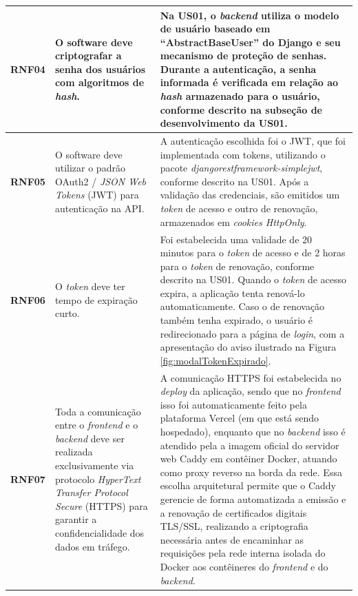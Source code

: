 \begin{longtable}{p{1.35cm}p{4.75cm}p{8.1cm}}
\textbf{RNF04} & O software deve criptografar a senha dos usuários com algoritmos de \textit{hash}. &
Na US01, o \textit{backend} utiliza o modelo de usuário baseado em ``AbstractBaseUser'' do Django e seu mecanismo de proteção de senhas. Durante a autenticação, a senha informada é verificada em relação ao \textit{hash} armazenado para o usuário, conforme descrito na subseção de desenvolvimento da US01. \\
\midrule

\textbf{RNF05} & O software deve utilizar o padrão OAuth2 / \textit{JSON Web Tokens} (JWT) para autenticação na API. &
A autenticação escolhida foi o JWT, que foi implementada com tokens, utilizando o pacote \textit{djangorestframework-simplejwt}, conforme descrito na US01. Após a validação das credenciais, são emitidos um \textit{token} de acesso e outro de renovação, armazenados em \textit{cookies HttpOnly}. \\
\midrule

\textbf{RNF06} & O \textit{token} deve ter tempo de expiração curto. &
Foi estabelecida uma validade de 20 minutos para o \textit{token} de acesso e de 2 horas para o \textit{token} de renovação, conforme descrito na US01. Quando o \textit{token} de acesso expira, a aplicação tenta renová-lo automaticamente. Caso o de renovação também tenha expirado, o usuário é redirecionado para a página de \textit{login}, com a apresentação do aviso ilustrado na Figura \ref{fig:modalTokenExpirado}. \\
\midrule

\textbf{RNF07} & Toda a comunicação entre o \textit{frontend} e o \textit{backend} deve ser realizada exclusivamente via protocolo \textit{HyperText Transfer Protocol Secure} (HTTPS) para garantir a confidencialidade dos dados em tráfego. &
A comunicação HTTPS foi estabelecida no \textit{deploy} da aplicação, sendo que no \textit{frontend} isso foi automaticamente feito pela plataforma Vercel (em que está sendo hospedado), enquanto que no \textit{backend} isso é atendido pela a imagem oficial do servidor web Caddy em contêiner Docker, atuando como proxy reverso na borda da rede. Essa escolha arquitetural permite que o Caddy gerencie de forma automatizada a emissão e a renovação de certificados digitais TLS/SSL, realizando a criptografia necessária antes de encaminhar as requisições pela rede interna isolada do Docker aos contêineres do \textit{frontend} e do \textit{backend}. \\
\midrule


\end{longtable}
